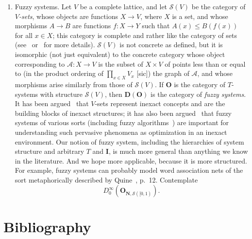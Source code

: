 \documentclass[10pt,a4paper,twocolumn]{article}
\newcommand{\A}{\mathcal{A}}          %
\newcommand{\Ocat}{\mathbf{O}}          %
\newcommand{\Dcat}{\mathbf{D}}          %
\newcommand{\Iset}{\mathbf{I}}          %
\begin{document}
\begin{enumerate}
  \item Fuzzy systems.
  Let $V$ be a complete lattice, and let $\mathcal{S}(V)$ be the category of \emph{$V$-sets}, whose objects are functions $X\to V$, where $X$ is a set, and whose morphisms $A \to B$ are functions $f\colon X\to Y$ such that $A(x) \leq B(f(x))$ for all $x\in X$; this category is complete and rather like the category of sets (see~\cite{GoguenLfuzzy} or~\cite{GoguenVsets} for more details).
  $\mathcal{S}(V)$ is not concrete as defined, but it is isomorphic (not just equivalent) to the concrete category whose object corresponding to $\A\colon X\to V$ is the subset of $X\times V$ of points less than or equal to (in the product ordering of $\prod_{x \in X} V_x$ [sic]) the graph of $\A$, and whose morphisms arise similarly from those of $\mathcal{S}(V)$.
  If $\Ocat$ is the category of $T$-systems with structure $\mathcal{S}(V)$, then $\Dcat(\Ocat)$ is the category of \emph{fuzzy systems}.
  It has been argued~\cite{GoguenLfuzzy,GoguenInexact} that $V$-sets represent inexact concepts and are the building blocks of inexact structures; it has also been argued~\cite{ZadehFuzzy} that fuzzy systems of various sorts (including fuzzy algorithms~\cite{ZadehAlgorithms}) are important for understanding such pervasive phenomena as optimization in an inexact environment.
  Our notion of fuzzy system, including the hierarchies of system structure and arbitrary $T$ and $\Iset$, is much more general than anything we know in the literature.
  And we hope more applicable, because it is more structured.
  For example, fuzzy systems can probably model word association nets of the sort metaphorically described by Quine~\cite{Quine}, p.~12.
  Contemplate
  \begin{equation*}
    D^\infty_0\left(\Ocat_{\mathbf{N}, \mathcal{S}([0,1)}\right).
  \end{equation*}
\end{enumerate}


\section*{Bibliography}
\end{document}
